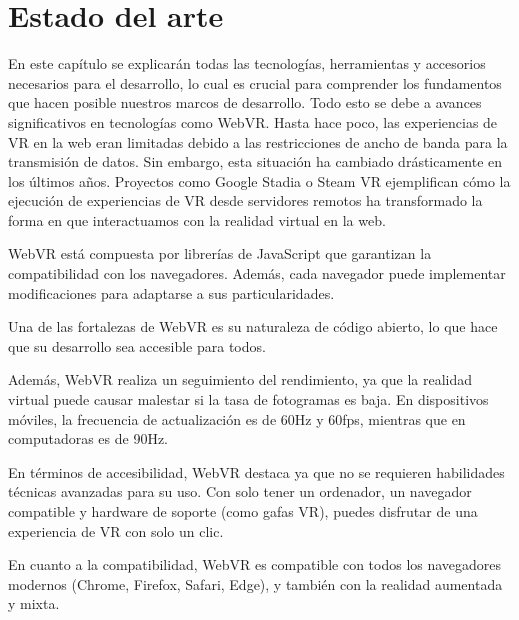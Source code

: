\documentclass[a4paper, 12pt]{book}
\begin{document}

\cleardoublepage
\chapter{Estado del arte}
\label{chap:estado}

En este capítulo se explicarán todas las tecnologías, herramientas y accesorios necesarios para el desarrollo, lo cual es crucial para 
comprender los fundamentos que hacen posible nuestros marcos de desarrollo. Todo esto se debe a avances significativos en tecnologías como WebVR. 
Hasta hace poco, las experiencias de VR en la web eran limitadas debido a las restricciones de ancho de banda para la transmisión de datos. 
Sin embargo, esta situación ha cambiado drásticamente en los últimos años. Proyectos como Google Stadia o Steam VR ejemplifican cómo la ejecución de experiencias de VR 
desde servidores remotos ha transformado la forma en que interactuamos con la realidad virtual en la web.

\bigskip

WebVR está compuesta por librerías de JavaScript que garantizan la compatibilidad con los navegadores. Además, cada navegador puede implementar 
modificaciones para adaptarse a sus particularidades.

\bigskip

Una de las fortalezas de WebVR es su naturaleza de código abierto, lo que hace que su desarrollo sea accesible para todos.

\bigskip

Además, WebVR realiza un seguimiento del rendimiento, ya que la realidad virtual puede causar malestar si la tasa de fotogramas es baja. En dispositivos 
móviles, la frecuencia de actualización es de 60Hz y 60fps, mientras que en computadoras es de 90Hz.

\bigskip

En términos de accesibilidad, WebVR destaca ya que no se requieren habilidades técnicas avanzadas para su uso. Con solo tener un ordenador, 
un navegador compatible y hardware de soporte (como gafas VR), puedes disfrutar de una experiencia de VR con solo un clic.

\bigskip

En cuanto a la compatibilidad, WebVR es compatible con todos los navegadores modernos (Chrome, Firefox, Safari, Edge), y también con la realidad 
aumentada y mixta.
\end{document}

